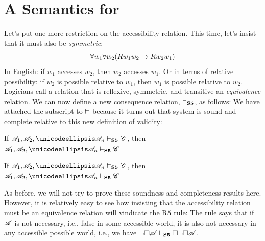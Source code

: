 \section{A Semantics for \mlSfive}
\label{SemanticsS5}

Let's put one more restriction on the accessibility relation. This time, let's insist that it must also be \emph{symmetric}:
\[\forall w_1\forall w_2(Rw_1w_2 \rightarrow Rw_2w_1)\]
In English: if $w_1$ accesses $w_2$, then $w_2$ accesses $w_1$. Or in terms of relative possibility: if $w_2$ is possible relative to $w_1$, then $w_1$ is possible relative to $w_2$. Logicians call a relation that is reflexive, symmetric, and transitive an \emph{equivalence} relation. We can now define a new consequence relation, $\vDash_{\mathbf{S5}} $, as follows:
We have attached the \mlSfive{} subscript to $\vDash$ because it turns out that system \mlSfive{} is sound and complete relative to this new definition of validity:
\begin{compactlist}
	\item If $\metav{A}_1,\metav{A}_2, \dots \metav{A}_n\proves_\mlSfive \metav{C}$, then $\metav{A}_1,\metav{A}_2, \dots \metav{A}_n\entails_\mlSfive \metav{C}$
	\item If $\metav{A}_1,\metav{A}_2, \dots \metav{A}_n\entails_\mlSfive \metav{C}$, then $\metav{A}_1,\metav{A}_2, \dots \metav{A}_n\proves_\mlSfive \metav{C}$
\end{compactlist}
As before, we will not try to prove these soundness and completeness results here. However, it is relatively easy to see how insisting that the accessibility relation must be an equivalence relation will vindicate the R$\mathbf{5}$ rule:
The rule says that if $\mathscr{A}$ is not necessary, i.e., false in some accessible world, it is also not necessary in any accessible possible world, i.e., we have $\neg\Box \mathscr{A} \vdash_{\mathbf{S5}}  \Box\neg\Box \mathscr{A}$.

